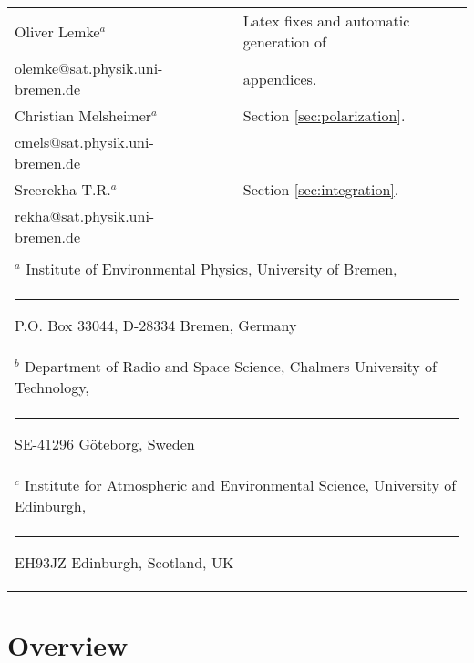 \begin{center}
\begin{tabular}{lp{10mm}l}
\hline
  Oliver Lemke$^a$ & & Latex fixes and automatic generation of\\
  olemke@sat.physik.uni-bremen.de & & appendices.\\
\hline
  Christian Melsheimer$^a$ & & Section \ref{sec:polarization}.\\
  cmels@sat.physik.uni-bremen.de & & \\
\hline
  Sreerekha T.R.$^a$ & & Section \ref{sec:integration}.\\
  rekha@sat.physik.uni-bremen.de & & \\
\hline
 && \\
\multicolumn{3}{l}{ $^a$
      Institute of Environmental Physics, University of Bremen, } \\
\multicolumn{3}{l}{\rule{1.5ex}{0pt}P.O. Box 33044, D-28334 Bremen, Germany} \\
\multicolumn{3}{l}{ $^b$
      Department of Radio and Space Science, 
      Chalmers University of Technology,} \\
\multicolumn{3}{l}{\rule{1.5ex}{0pt}SE-41296 G\"oteborg, Sweden} \\
\multicolumn{3}{l}{ $^c$
      Institute for Atmospheric and Environmental Science, 
      University of Edinburgh,} \\
\multicolumn{3}{l}{\rule{1.5ex}{0pt}EH93JZ Edinburgh, Scotland, UK} \\

\end{tabular}
\end{center}



%
\newpage
\thispagestyle{empty}
\rule{0pt}{10pt}
\newpage

\tableofcontents

\cleardoublepage
{}
     

%
%
\part{Overview}



%
